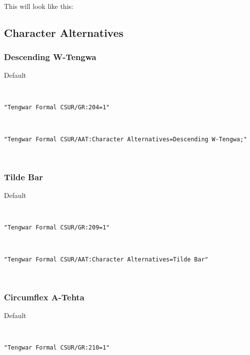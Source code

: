 \documentclass[11pt,a4paper]{article}
\begin{document}
\paragraph{} This will look like this: \myformal   \normalfont



\subsection{Character Alternatives}



\subsubsection{Descending W-Tengwa}


Default

\formalGR  

\noindent \texttt{"Tengwar Formal CSUR/GR:204=1"}

\formalGRdescw  

\noindent \texttt{"Tengwar Formal CSUR/AAT:Character Alternatives=Descending W-Tengwa;"}

\formalAATdescw   \normalfont



\subsubsection{Tilde Bar}


Default

\formalGR 

\noindent\texttt{"Tengwar Formal CSUR/GR:209=1"}

\formalGRtilde 

\noindent\texttt{"Tengwar Formal CSUR/AAT:Character Alternatives=Tilde Bar"}

\formalAATtilde  \normalfont



\subsubsection{Circumflex A-Tehta}


Default

\formalGR 

\noindent\texttt{"Tengwar Formal CSUR/GR:210=1"}

\formalGRcircumflex 
\end{document}

